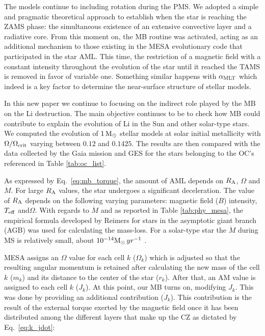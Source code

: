 \documentclass[fleqn,usenatbib]{mnras}
\begin{document}
The models continue to including rotation during the PMS. We adopted a simple and pragmatic theoretical approach to establish when the star is reaching the ZAMS phase: the simultaneous existence of an extensive convective layer and a radiative core. From this moment on, the MB routine was activated, acting as an additional mechanism to those existing in the MESA evolutionary code that participated in the star AML. This time, the restriction of a magnetic field with a constant intensity throughout the evolution of the star until it reached the TAMS is removed in favor of variable one. Something similar happens with $\alpha_{\mathrm{MLT}}$ which indeed is  a key factor to determine the near-surface structure of stellar models. 

In this new paper we continue to focusing on the indirect role played by the MB on the Li destruction. The main objective continues to be to check how MB could contribute to explain the evolution of Li in the Sun and other solar-type stars. We computed the evolution of $1\,\mathrm{M}_\odot$ stellar models at solar initial metallicity with $\Omega / \Omega_{\mathrm{crit}}$ varying between $0.12$ and $0.1425$. The results are then compared with the data collected by the Gaia mission and GES for the stars belonging to the OC's referenced in Table \ref{tab:oc_list}.\par


As expressed by Eq.~\ref{eq:mb_torque}, the amount of AML depends on $R_{\mathrm{A}}$, $\Omega$ and $\Dot{M}$. For large $R_{\mathrm{A}}$ values, the star undergoes a significant deceleration. The value of $R_{\mathrm{A}}$ depends on the following varying parameters: magnetic field ($B$) intensity, $T_{\mathrm{eff}}$ and$\Omega$. With regards to $\Dot{M}$ and as reported in Table \ref{tab:phy_mesa}, the empirical formula developed by Reimers \citep{Reimers1975} for stars in the asymptotic giant branch (AGB) was used for calculating the mass-loss. For a solar-type star the $\Dot{M}$ during MS is relatively small, about  $10^{-14}\mathrm{M}_\odot \, yr^{-1}$ \citep{Noerdlinger2008}. \par

MESA assigns an $\Omega$ value for each cell $k$ ($\Omega_k$) which is adjusted so that the resulting angular momentum is retained after calculating the new mass of the cell $k$ ($m_k$) and its distance to the center of the star ($r_k$). After that, an AM value is assigned to each cell $k$ ($J_k$). At this point, our MB turns on, modifying $J_k$. This was done by providing an additional contribution ($\Dot{J}_{k}$). This contribution is the result of the external torque exerted by the magnetic field once it has been distributed among the different layers that make up the CZ as dictated by Eq.~\ref{eq:k_jdot}:\par
 
\end{document}

